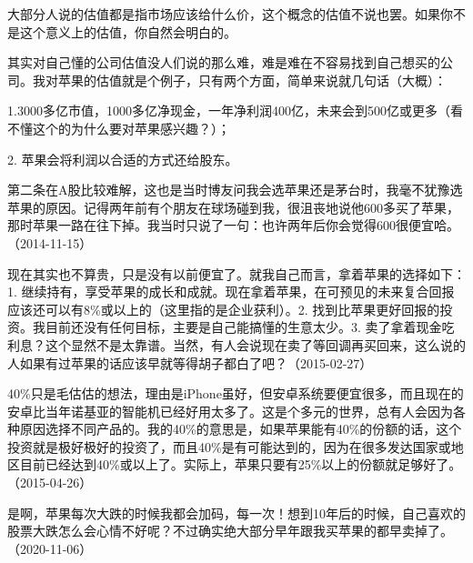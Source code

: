 
大部分人说的估值都是指市场应该给什么价，这个概念的估值不说也罢。如果你不是这个意义上的估值，你自然会明白的。

其实对自己懂的公司估值没人们说的那么难，难是难在不容易找到自己想买的公司。我对苹果的估值就是个例子，只有两个方面，简单来说就几句话（大概）：

1.3000多亿市值，1000多亿净现金，一年净利润400亿，未来会到500亿或更多（看不懂这个的为什么要对苹果感兴趣？）；

2. 苹果会将利润以合适的方式还给股东。

第二条在A股比较难解，这也是当时博友问我会选苹果还是茅台时，我毫不犹豫选苹果的原因。记得两年前有个朋友在球场碰到我，很沮丧地说他600多买了苹果，那时苹果一路在往下掉。我当时只说了一句：也许两年后你会觉得600很便宜哈。（2014-11-15）


现在其实也不算贵，只是没有以前便宜了。就我自己而言，拿着苹果的选择如下：1. 继续持有，享受苹果的成长和成就。现在拿着苹果，在可预见的未来复合回报应该还可以有8\%或以上的（这里指的是企业获利）。2. 找到比苹果更好回报的投资。我目前还没有任何目标，主要是自己能搞懂的生意太少。3. 卖了拿着现金吃利息？这个显然不是太靠谱。当然，有人会说现在卖了等回调再买回来，这么说的人如果有过苹果的话应该早就等得胡子都白了吧？（2015-02-27）


40\%只是毛估估的想法，理由是iPhone虽好，但安卓系统要便宜很多，而且现在的安卓比当年诺基亚的智能机已经好用太多了。这是个多元的世界，总有人会因为各种原因选择不同产品的。我的40\%的意思是，如果苹果能有40\%的份额的话，这个投资就是极好极好的投资了，而且40\%是有可能达到的，因为在很多发达国家或地区目前已经达到40\%或以上了。实际上，苹果只要有25\%以上的份额就足够好了。（2015-04-26）


是啊，苹果每次大跌的时候我都会加码，每一次！想到10年后的时候，自己喜欢的股票大跌怎么会心情不好呢？不过确实绝大部分早年跟我买苹果的都早卖掉了。（2020-11-06）

